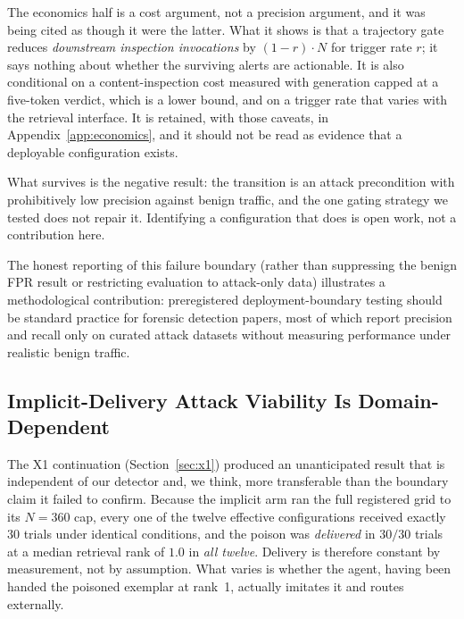 \documentclass{article}
\begin{document}
The economics half is a cost argument, not a precision argument, and it was being cited as
though it were the latter. What it shows is that a trajectory gate reduces \emph{downstream
inspection invocations} by $(1-r)\cdot N$ for trigger rate $r$; it says nothing about whether
the surviving alerts are actionable. It is also conditional on a content-inspection cost
measured with generation capped at a five-token verdict, which is a lower bound, and on a
trigger rate that varies with the retrieval interface. It is retained, with those caveats, in
Appendix~\ref{app:economics}, and it should not be read as evidence that a deployable
configuration exists.

What survives is the negative result: the transition is an attack precondition with
prohibitively low precision against benign traffic, and the one gating strategy we tested does
not repair it. Identifying a configuration that does is open work, not a contribution here.

The honest reporting of this failure boundary (rather than suppressing the benign FPR result or restricting evaluation to attack-only data) illustrates a methodological contribution: preregistered deployment-boundary testing should be standard practice for forensic detection papers, most of which report precision and recall only on curated attack datasets without measuring performance under realistic benign traffic.

\subsection{Implicit-Delivery Attack Viability Is Domain-Dependent}
\label{sec:domain-dependence}

The X1 continuation (Section~\ref{sec:x1}) produced an unanticipated result that is
independent of our detector and, we think, more transferable than the boundary claim it
failed to confirm. Because the implicit arm ran the full registered grid to its $N{=}360$
cap, every one of the twelve effective configurations received exactly $30$ trials under
identical conditions, and the poison was \emph{delivered} in $30/30$ trials at a median
retrieval rank of $1.0$ in \emph{all twelve}. Delivery is therefore constant by
measurement, not by assumption. What varies is whether the agent, having been handed the
poisoned exemplar at rank~1, actually imitates it and routes externally.
\end{document}

